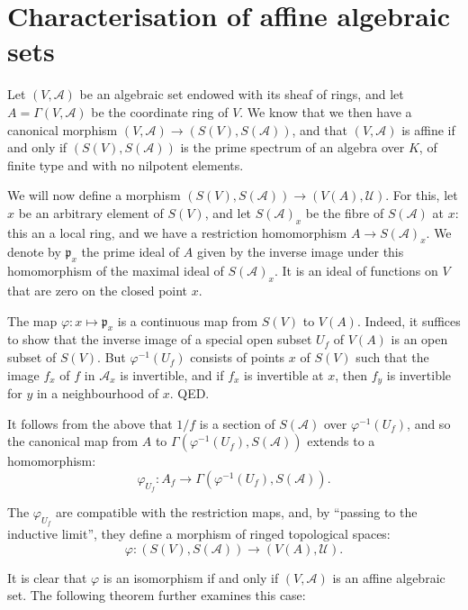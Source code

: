\documentclass{article}
\theoremstyle{plain}
\newcommand{\sh}{\mathscr}
\newcommand{\oldpage}[1]{\marginpar{\footnotesize$\Big\vert$ \textit{p.~#1}}}
\begin{document}
\section{Characterisation of affine algebraic sets}
\label{section4}

Let $(V,\sh{A})$ be an algebraic set endowed with its sheaf of rings, and let $A=\Gamma(V,\sh{A})$ be the coordinate ring of $V$.
We know that we then have a canonical morphism $(V,\sh{A})\to(S(V),S(\sh{A}))$, and that $(V,\sh{A})$ is affine if and only if $(S(V),S(\sh{A}))$ is the prime spectrum of an algebra over $K$, of finite type and with no nilpotent elements.

We will now define a morphism $(S(V),S(\sh{A}))\to(V(A),\sh{U})$.
For this, let $x$ be an arbitrary element of $S(V)$, and let $S(\sh{A})_x$ be the fibre of $S(\sh{A})$ at $x$: this an a local ring, and we have a restriction homomorphism $A\to S(\sh{A})_x$.
We denote by $\mathfrak{p}_x$ the prime ideal of $A$ given by the inverse image under this homomorphism of the maximal ideal of $S(\sh{A})_x$.
It is an ideal of functions on $V$ that are zero on the closed point $x$.

The map $\varphi\colon x\mapsto\mathfrak{p}_x$ is a continuous map from $S(V)$ to $V(A)$.
Indeed, it suffices to show that the inverse image of a special open subset $U_f$ of $V(A)$ is an open subset of $S(V)$.
But $\varphi^{-1}(U_f)$ consists of points $x$ of $S(V)$ such that the image $f_x$ of $f$ in $\sh{A}_x$ is invertible, and if $f_x$ is invertible at $x$, then $f_y$ is invertible for $y$ in a neighbourhood of $x$.
QED.

It follows from the above that $1/f$ is a section of $S(\sh{A})$ over $\varphi^{-1}(U_f)$, and so the canonical map from $A$ to $\Gamma(\varphi^{-1}(U_f),S(\sh{A}))$ extends to a homomorphism:
\[
  \varphi_{U_f}\colon A_f \to \Gamma(\varphi^{-1}(U_f), S(\sh{A})).
\]

The $\varphi_{U_f}$ are compatible with the restriction maps, and, by ``passing to the inductive limit'', they define a morphism of ringed topological spaces:
\oldpage{2-05}
\[
  \varphi\colon (S(V),S(\sh{A})) \to (V(A),\sh{U}).
\]

It is clear that $\varphi$ is an isomorphism if and only if $(V,\sh{A})$ is an affine algebraic set.
The following theorem further examines this case:
\end{document}

